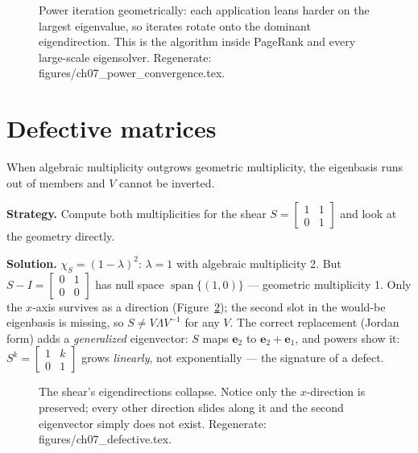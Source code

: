 \begin{figure}[htbp]
\centering

\caption{Power iteration geometrically: each application leans harder on
the largest eigenvalue, so iterates rotate onto the dominant
eigendirection. This is the algorithm inside PageRank and every
large-scale eigensolver. Regenerate:
\ttfamily figures/ch07\_power\_convergence.tex.}
\label{fig:power-conv}
\end{figure}

\section{Defective matrices}\label{sec:eig-defective}

When algebraic multiplicity outgrows geometric multiplicity, the
eigenbasis runs out of members and $V$ cannot be inverted.

\begin{example}\label{ex:defective}
\textbf{Strategy.} Compute both multiplicities for the shear
$S=\begin{bmatrix}1&1\\0&1\end{bmatrix}$ and look at the geometry directly.

\textbf{Solution.} $\chi_S=(1-\lambda)^2$: $\lambda=1$ with algebraic
multiplicity 2. But $S-I=\begin{bmatrix}0&1\\0&0\end{bmatrix}$ has null
space $\operatorname{span}\{(1,0)\}$ --- geometric multiplicity 1. Only the
$x$-axis survives as a direction (Figure~\ref{fig:defective}); the second
slot in the would-be eigenbasis is missing, so $S\ne V\Lambda V^{-1}$ for
any $V$. The correct replacement (Jordan form) adds a \emph{generalized}
eigenvector: $S$ maps $\mathbf e_2$ to $\mathbf e_2+\mathbf e_1$, and
powers show it: $S^k=\begin{bmatrix}1&k\\0&1\end{bmatrix}$ grows
\emph{linearly}, not exponentially --- the signature of a defect.
\end{example}

\begin{figure}[htbp]
\centering

\caption{The shear's eigendirections collapse. Notice only the
$x$-direction is preserved; every other direction slides along it and the
second eigenvector simply does not exist. Regenerate:
\ttfamily figures/ch07\_defective.tex.}
\label{fig:defective}
\end{figure}

